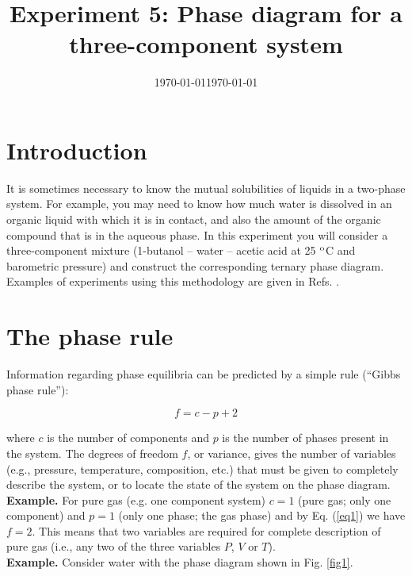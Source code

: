 \documentclass[byrevtex,amssymb,aps,pra,floatfix,letterpaper]{revtex4}
\date{\today}
\begin{document}
\title{Experiment 5: Phase diagram for a three-component system}

\date{\today}

\maketitle

\section{Introduction}

It is sometimes necessary to know the mutual solubilities of liquids in a two-phase system. For example, you may need to know how much water is dissolved in an organic liquid with which it is in contact, and also the amount of the organic compound that is in the aqueous phase. In this experiment you will consider a three-component mixture (1-butanol -- water -- acetic acid at 25 $^\textnormal{o}$C and barometric pressure) and construct the corresponding ternary phase diagram. Examples of experiments using this methodology are given in Refs. \cite{CLARKE,STEAD,PARK}.

\section{The phase rule}

Information regarding phase equilibria can be predicted by a simple rule (``Gibbs phase rule''):

\begin{equation}
f = c - p + 2
\label{eq1}
\end{equation}

\noindent
where $c$ is the number of components and $p$ is the number of phases present in the system. The degrees of freedom $f$, or variance, gives the number of variables (e.g., pressure, temperature, composition, etc.) that must be given to completely describe the system, or to locate the state of the system on the phase diagram.\\

\noindent
\textbf{Example.} For pure gas (e.g. one component system) $c = 1$ (pure gas; only one component) and $p = 1$ (only one phase; the gas phase) and by Eq. (\ref{eq1}) we have $f = 2$. This means that two variables are required for complete description of pure gas (i.e., any two of the three variables $P$, $V$ or $T$).\\

\noindent
\textbf{Example.} Consider water with the phase diagram shown in Fig. \ref{fig1}.
\end{document}
